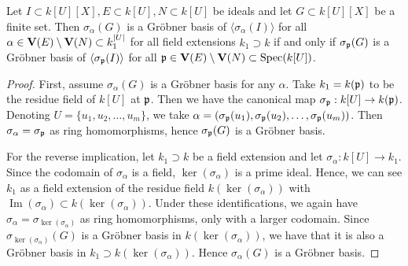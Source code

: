 \begin{lemma}\label{lem:sigma_p_sigma_alpha}
  Let $I \subset k[U][X], E \subset k[U], N \subset k[U]$ be ideals and let $G \subset k[U][X]$ be a finite set. Then $\sigma_{\alpha}(G)$ is a Gröbner basis of $\langle \sigma_{\alpha}(I) \rangle$ for all $\alpha \in \operatorname{\mathbf V}(E) \setminus \operatorname{\mathbf V}(N) \subset k_{1}^{|U|}$ for all field extensions $k_{1} \supset k$ if and only if $\sigma_{\mathfrak p}(G)$ is a Gröbner basis of $\langle \sigma_{\mathfrak p}(I) \rangle$ for all $\mathfrak p \in \operatorname{\mathbf V}(E) \setminus \operatorname{\mathbf V}(N) \subset \operatorname{Spec}(k[U])$.
\end{lemma}
\begin{proof}
  First, assume $\sigma_{\alpha}(G)$ is a Gröbner basis for any $\alpha$. Take $k_{1} = k(\mathfrak p)$ to be the residue field of $k[U]$ at $\mathfrak p$. Then we have the canonical map $\sigma_{\mathfrak p} : k[U] \to k(\mathfrak p)$. Denoting $U = \{u_{1}, u_{2}, \dots, u_{m}\}$, we take $\alpha = (\sigma_{\mathfrak p}(u_{1}), \sigma_{\mathfrak p}(u_{2}), \dots, \sigma_{\mathfrak p}(u_{m}))$. Then $\sigma_{\alpha} = \sigma_{\mathfrak p}$ as ring homomorphisms, hence $\sigma_{\mathfrak p}(G)$ is a Gröbner basis.

  For the reverse implication, let $k_{1} \supset k$ be a field extension and let $\sigma_{\alpha} : k[U] \to k_{1}$. Since the codomain of $\sigma_{\alpha}$ is a field, $\ker(\sigma_{\alpha})$ is a prime ideal. Hence, we can see $k_{1}$ as a field extension of the residue field $k(\ker(\sigma_{\alpha}))$ with $\operatorname{Im}(\sigma_{\alpha}) \subset k(\ker(\sigma_{\alpha}))$. Under these identifications, we again have $\sigma_{\alpha} = \sigma_{\ker(\sigma_{\alpha})}$ as ring homomorphisms, only with a larger codomain. Since $\sigma_{\ker(\sigma_{\alpha})}(G)$ is a Gröbner basis in $k(\ker(\sigma_{\alpha}))$, we have that it is also a Gröbner basis in $k_{1} \supset k(\ker(\sigma_{\alpha}))$. Hence $\sigma_{\alpha}(G)$ is a Gröbner basis.
\end{proof}


